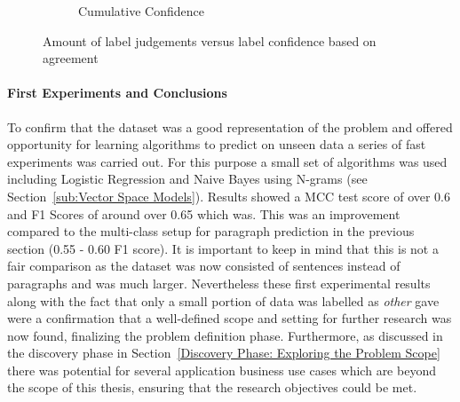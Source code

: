 \begin{figure}[h]
\begin{subfigure}[b]{0.43\textwidth}
        \caption{Cumulative Confidence}
\label{fig:sentence-data-judgement-confidence-cumulative}
    \end{subfigure}
    \caption{Amount of label judgements versus label confidence based on agreement}
\label{fig:sentence-data-judgements}
\end{figure}

\paragraph{First Experiments and Conclusions}
\label{par:First Experiments and Conclusions}

To confirm that the dataset was a good representation of the problem and offered opportunity for learning algorithms to predict on unseen data a series of fast experiments was carried out.
For this purpose a small set of algorithms was used including Logistic Regression and Naive Bayes using N-grams (see Section~\ref{sub:Vector Space Models}). Results showed a \gls{MCC} test score of over 0.6 and F1 Scores of around over 0.65 which was. This was an improvement compared to the multi-class setup for paragraph prediction in the previous section (0.55 - 0.60 F1 score).
It is important to keep in mind that this is not a fair comparison as the dataset was now consisted of sentences instead of paragraphs and was much larger.
Nevertheless these first experimental results along with the fact that only a small portion of data was labelled as \emph{other} gave were a confirmation that a well-defined scope and setting for further research was now found, finalizing the problem definition phase. Furthermore, as discussed in the discovery phase in Section~\ref{Discovery Phase: Exploring the Problem Scope} there was potential for several application business use cases which are beyond the scope of this thesis, ensuring that the research objectives could be met.

